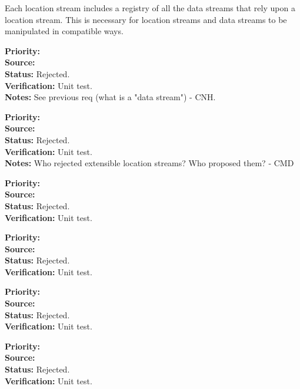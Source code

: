 Each location stream includes a registry of all the data streams that rely upon a
location stream.  This is necessary for location streams and data streams to be
manipulated in compatible ways.
\begin{reqlist}
{\bf Priority:}  \\
{\bf Source:} \\
{\bf Status:} Rejected. \\
{\bf Verification:} Unit test. \\
{\bf Notes:} See previous req (what is a "data stream") - CNH.
\end{reqlist}

\begin{reqlist}
{\bf Priority:}  \\
{\bf Source:} \\
{\bf Status:} Rejected. \\
{\bf Verification:} Unit test. \\
{\bf Notes:} Who rejected extensible location streams? Who proposed them? - CMD
\end{reqlist}

\begin{reqlist}
{\bf Priority:}  \\
{\bf Source:} \\
{\bf Status:} Rejected. \\
{\bf Verification:} Unit test.
\end{reqlist}

\begin{reqlist}
{\bf Priority:}  \\
{\bf Source:} \\
{\bf Status:} Rejected. \\
{\bf Verification:} Unit test. 
\end{reqlist}

\begin{reqlist}
{\bf Priority:}  \\
{\bf Source:} \\
{\bf Status:} Rejected. \\
{\bf Verification:} Unit test.
\end{reqlist}

\begin{reqlist}
{\bf Priority:}  \\
{\bf Source:} \\
{\bf Status:} Rejected. \\
{\bf Verification:} Unit test. 
\end{reqlist}

